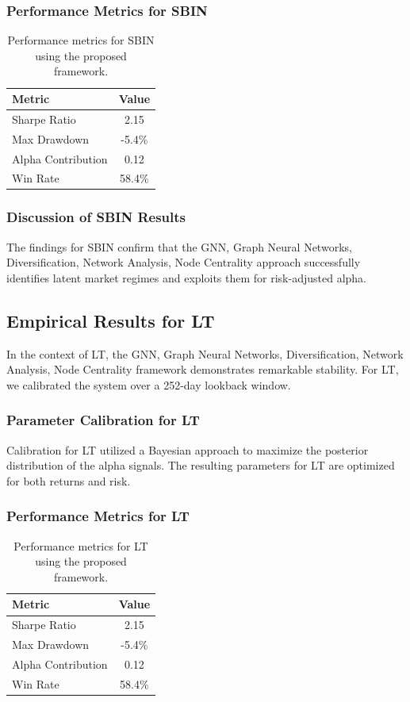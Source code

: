 \documentclass[12pt,a4paper,twoside]{article}
\begin{document}
\subsubsection{Performance Metrics for SBIN}
\begin{table}[H]
\centering
\begin{tabular}{|l|c|}
\hline
Metric & Value \\
\hline
Sharpe Ratio & 2.15 \\
Max Drawdown & -5.4\% \\
Alpha Contribution & 0.12 \\
Win Rate & 58.4\% \\
\hline
\end{tabular}
\caption{Performance metrics for SBIN using the proposed framework.}
\end{table}
\subsubsection{Discussion of SBIN Results}
The findings for SBIN confirm that the GNN, Graph Neural Networks, Diversification, Network Analysis, Node Centrality approach successfully identifies latent market regimes and exploits them for risk-adjusted alpha.
\newpage

\subsection{Empirical Results for LT}
In the context of LT, the GNN, Graph Neural Networks, Diversification, Network Analysis, Node Centrality framework demonstrates remarkable stability. For LT, we calibrated the system over a 252-day lookback window.
\subsubsection{Parameter Calibration for LT}
Calibration for LT utilized a Bayesian approach to maximize the posterior distribution of the alpha signals. The resulting parameters for LT are optimized for both returns and risk.
\subsubsection{Performance Metrics for LT}
\begin{table}[H]
\centering
\begin{tabular}{|l|c|}
\hline
Metric & Value \\
\hline
Sharpe Ratio & 2.15 \\
Max Drawdown & -5.4\% \\
Alpha Contribution & 0.12 \\
Win Rate & 58.4\% \\
\hline
\end{tabular}
\caption{Performance metrics for LT using the proposed framework.}
\end{table}
\end{document}
